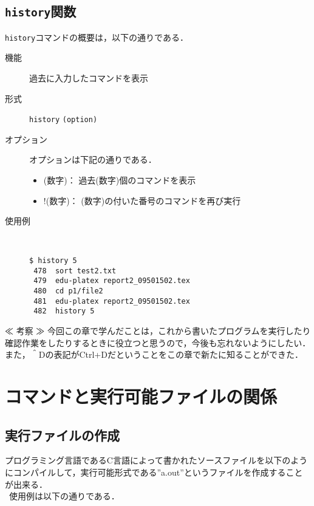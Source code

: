 \documentclass[a4j,11pt]{jarticle}
\begin{document}
\subsection{\texttt{history}関数}

\verb|history|コマンドの概要は，以下の通りである．
\begin{description}
  \item[機能]
    過去に入力したコマンドを表示
  \item[形式]
    \verb|history| \verb|(option)|
  \item[オプション]
    オプションは下記の通りである．
    \begin{itemize}
      \item (数字)：  過去(数字)個のコマンドを表示
      \item !(数字)：  (数字)の付いた番号のコマンドを再び実行
    \end{itemize}
  \item[使用例]
    \begin{verbatim}


$ history 5
 478  sort test2.txt
 479  edu-platex report2_09501502.tex
 480  cd p1/file2
 481  edu-platex report2_09501502.tex
 482  history 5

    \end{verbatim}
\end{description}

≪ 考察 ≫
今回この章で学んだことは，これから書いたプログラムを実行したり確認作業をしたりするときに役立つと思うので，今後も忘れないようにしたい．また，＾Dの表記がCtrl+Dだということをこの章で新たに知ることができた．


\vspace{\baselineskip}
\section{コマンドと実行可能ファイルの関係} %

\subsection{実行ファイルの作成}

プログラミング言語であるC言語によって書かれたソースファイルを以下のようにコンパイルして，実行可能形式である”a.out”というファイルを作成することが出来る．\\
\ 使用例は以下の通りである．
\end{document}
